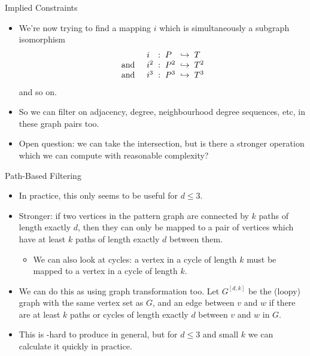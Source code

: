 \documentclass{beamer}
\begin{document}
\begin{frame}{Implied Constraints}
    \begin{itemize}
        \item We're now trying to find a mapping $i$ which is simultaneously a subgraph isomorphism
            \[
                \begin{array}{l@{\hskip 0.5cm}l@{\hskip 2mm}c@{\hskip 2mm}l@{\hskip 2mm}c@{\hskip 2mm}l}
                    &i &:& P &\hookrightarrow& T \\
                    \textnormal{and}& i^2 &:& P^2 &\hookrightarrow& T^2 \\
                    \textnormal{and}& i^3 &:& P^3 &\hookrightarrow& T^3
                \end{array}
            \] and so on.

        \item So we can filter on adjacency, degree, neighbourhood degree sequences, etc, in
            these graph pairs too.

        \item Open question: we can take the intersection, but is there a stronger operation
            which we can compute with reasonable complexity?
    \end{itemize}
\end{frame}

\begin{frame}{Path-Based Filtering}
    \begin{itemize}
        \item In practice, this only seems to be useful for $d \le 3$.

        \item Stronger: if two vertices in the pattern graph are connected by $k$ paths of
            length exactly $d$, then they can only be mapped to a pair of vertices which have at
            least $k$ paths of length exactly $d$ between them.

            \begin{itemize}
                \item We can also look at cycles: a vertex in a cycle of length $k$ must be mapped to a
                    vertex in a cycle of length $k$.
            \end{itemize}

        \item We can do this as using graph transformation too. Let $G^{\left[d, k\right]}$ be the
            (loopy) graph with the same vertex set as $G$, and an edge between $v$ and $w$ if there are at
            least $k$ paths or cycles of length exactly $d$ between $v$ and $w$ in $G$.

        \item This is \NP-hard to produce in general, but for $d \le 3$ and small $k$ we can
            calculate it quickly in practice.
    \end{itemize}
\end{frame}
\end{document}
